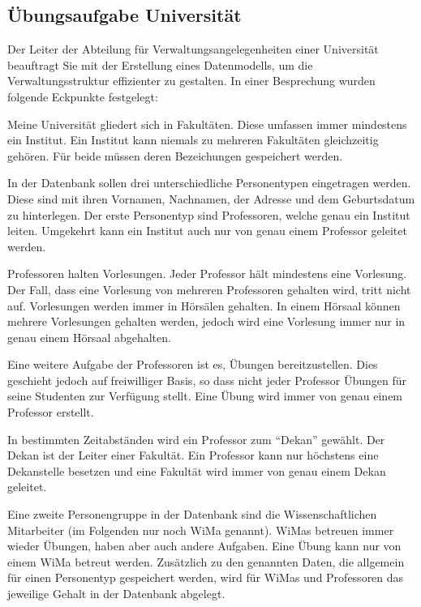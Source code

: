       \subsection{Übungsaufgabe Universität}
        Der Leiter der Abteilung für Verwaltungsangelegenheiten einer
        Universität beauftragt Sie mit der Erstellung eines Datenmodells, um
        die Verwaltungsstruktur effizienter zu gestalten. In einer Besprechung
        wurden folgende Eckpunkte festgelegt:

        Meine Universität gliedert sich in Fakultäten. Diese umfassen immer
        mindestens ein Institut. Ein Institut kann niemals zu mehreren
        Fakultäten gleichzeitig gehören. Für beide müssen deren
        Bezeichungen gespeichert werden.

        In der Datenbank sollen drei unterschiedliche Personentypen eingetragen
        werden. Diese sind mit ihren Vornamen, Nachnamen, der Adresse und dem
        Geburtsdatum zu hinterlegen. Der erste Personentyp sind Professoren,
        welche genau ein Institut leiten. Umgekehrt kann ein Institut auch nur
        von genau einem Professor geleitet werden.

        Professoren halten Vorlesungen. Jeder Professor hält mindestens eine
        Vorlesung. Der Fall, dass eine Vorlesung von mehreren Professoren
        gehalten wird, tritt nicht auf. Vorlesungen werden immer in
        Hörsälen gehalten. In einem Hörsaal können mehrere Vorlesungen
        gehalten werden, jedoch wird eine Vorlesung immer nur in genau einem
        Hörsaal abgehalten.

        Eine weitere Aufgabe der Professoren ist es, Übungen bereitzustellen.
        Dies geschieht jedoch auf freiwilliger Basis, so dass nicht jeder
        Professor Übungen für seine Studenten zur Verfügung stellt. Eine
        Übung wird immer von genau einem Professor erstellt.

        In bestimmten Zeitabständen wird ein Professor zum \enquote{Dekan}
        gewählt. Der Dekan ist der Leiter einer Fakultät. Ein Professor kann
        nur höchstens eine Dekanstelle besetzen und eine Fakultät wird immer
        von genau einem Dekan geleitet.

        Eine zweite Personengruppe in der Datenbank sind die Wissenschaftlichen
        Mitarbeiter (im Folgenden nur noch WiMa genannt). WiMas betreuen immer
        wieder Übungen, haben aber auch andere Aufgaben. Eine Übung kann nur
        von einem WiMa betreut werden. Zusätzlich zu den genannten Daten, die
        allgemein für einen Personentyp gespeichert werden, wird für WiMas
        und Professoren das jeweilige Gehalt in der Datenbank abgelegt.

